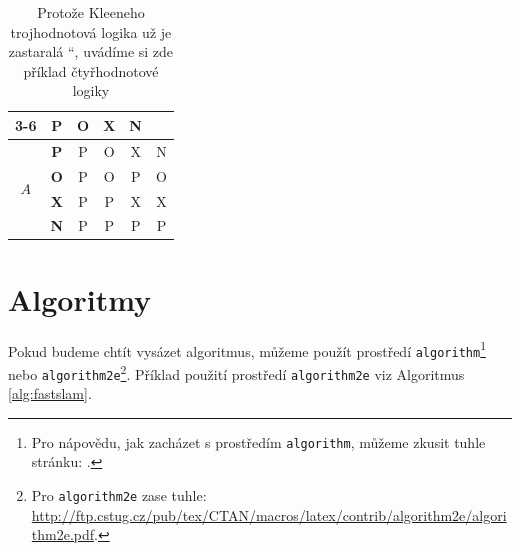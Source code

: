 \documentclass[a4paper, 11pt, final]{article}
\providecommand{\uv}[1]{\quotedblbase #1 \textquotedblleft}
\begin{document}
\begin{table}[ht]
\begin{tabular}{| c | c | c | c| c | c |}
        \cline{3-6} %
        \multicolumn{2}{| c |}{}                                   & \textbf{P} & \textbf{O} & \textbf{X} & \textbf{N} \\
        \hline %
        \multirow{4}{*}{$A$}             & \textbf{P}              & P          & O          & X          & N          \\
        \cline{2-6} %
                                         & \textbf{O}              & P          & O          & P          & O          \\
        \cline{2-6} %
                                         & \textbf{X}              & P          & P          & X          & X          \\
        \cline{2-6} %
                                         & \textbf{N}              & P          & P          & P          & P          \\
        \hline %
    \end{tabular}

    \caption{Protože Kleeneho trojhodnotová logika už je \uv{zastaralá}, uvádíme si zde příklad čtyřhodnotové logiky}
    \label{tab:4-value-logic}
\end{table}
\pagebreak

\section{Algoritmy}
\label{sec:algorithms}

Pokud budeme chtít vysázet algoritmus, můžeme použít prostředí \texttt{algorithm}\footnote{\raggedright Pro nápovědu, jak zacházet s prostředím \texttt{algorithm}, můžeme zkusit tuhle stránku: .} nebo \texttt{algorithm2e}\footnote{Pro \texttt{algorithm2e} zase tuhle: \url{http://ftp.cstug.cz/pub/tex/CTAN/macros/latex/contrib/algorithm2e/algorithm2e.pdf}.}.\break
Příklad použití prostředí \texttt{algorithm2e} viz Algoritmus \ref{alg:fastslam}.
\end{document}

